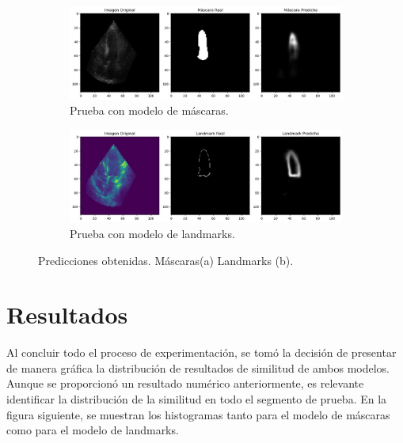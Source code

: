 \documentclass[runningheads]{llncs}
\begin{document}
\begin{figure}
    \centering
    \begin{subfigure}{0.45\linewidth}
        \includegraphics[scale= 0.18]{images/mask_test.jpg}
        \caption{Prueba con modelo de máscaras.}
    \end{subfigure}
    \begin{subfigure}{0.45\linewidth}
        \includegraphics[scale= 0.18]{images/landmark_test.jpg}
        \caption{Prueba con modelo de landmarks.}
    \end{subfigure}
    \caption{Predicciones obtenidas. Máscaras(a) Landmarks (b).}
\end{figure}


\section{Resultados}

Al concluir todo el proceso de experimentación, se tomó la decisión de presentar de manera gráfica la distribución de resultados de similitud de ambos modelos. Aunque se proporcionó un resultado numérico anteriormente, es relevante identificar la distribución de la similitud en todo el segmento de prueba. En la figura siguiente, se muestran los histogramas tanto para el modelo de máscaras como para el modelo de landmarks.
\end{document}
